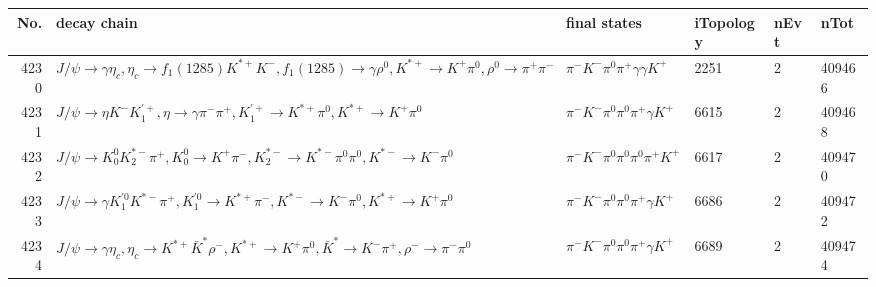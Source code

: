 \begin{table}[htbp] 
\begin{center}
\begin{small}
\begin{tabular}{rlllll}\hline\hline
 No. & decay chain & final states &  iTopology & nEvt & nTot \\\hline
4230&$J/\psi       \rightarrow \gamma       \eta_{c}    , \eta_{c}     \rightarrow f_{1}(1285)    K^{*+}         K^{-}          , f_{1}(1285)     \rightarrow \gamma       \rho^{0}      , K^{*+}          \rightarrow K^{+}          \pi^{0}        , \rho^{0}       \rightarrow \pi^{+}        \pi^{-}        $&$\pi^{-}        K^{-}          \pi^{0}        \pi^{+}        \gamma       \gamma       K^{+}          $& 2251&    2&409466\\
4231&$J/\psi       \rightarrow \eta          K^{-}          K_1^{'+}      , \eta           \rightarrow \gamma       \pi^{-}        \pi^{+}        , K_1^{'+}       \rightarrow K^{*+}         \pi^{0}        , K^{*+}          \rightarrow K^{+}          \pi^{0}        $&$\pi^{-}        K^{-}          \pi^{0}        \pi^{0}        \pi^{+}        \gamma       K^{+}          $& 6615&    2&409468\\
4232&$J/\psi       \rightarrow K_0^{0}        K_2^{*-}       \pi^{+}        , K_0^{0}         \rightarrow K^{+}          \pi^{-}        , K_2^{*-}        \rightarrow K^{*-}         \pi^{0}        \pi^{0}        , K^{*-}          \rightarrow K^{-}          \pi^{0}        $&$\pi^{-}        K^{-}          \pi^{0}        \pi^{0}        \pi^{0}        \pi^{+}        K^{+}          $& 6617&    2&409470\\
4233&$J/\psi       \rightarrow \gamma       K_1^{'0}      K^{*-}         \pi^{+}        , K_1^{'0}       \rightarrow K^{*+}         \pi^{-}        , K^{*-}          \rightarrow K^{-}          \pi^{0}        , K^{*+}          \rightarrow K^{+}          \pi^{0}        $&$\pi^{-}        K^{-}          \pi^{0}        \pi^{0}        \pi^{+}        \gamma       K^{+}          $& 6686&    2&409472\\
4234&$J/\psi       \rightarrow \gamma       \eta_{c}    , \eta_{c}     \rightarrow K^{*+}         \bar{K}^{*}   \rho^{-}      , K^{*+}          \rightarrow K^{+}          \pi^{0}        , \bar{K}^{*}    \rightarrow K^{-}          \pi^{+}        , \rho^{-}       \rightarrow \pi^{-}        \pi^{0}        $&$\pi^{-}        K^{-}          \pi^{0}        \pi^{0}        \pi^{+}        \gamma       K^{+}          $& 6689&    2&409474\\

\end{tabular}
\end{small}
\end{center}
\end{table}
